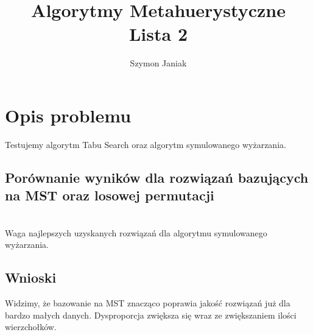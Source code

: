 \documentclass{article}
\title{%
	Algorytmy Metahuerystyczne \\
	\large Lista 2}
\author{Szymon Janiak}
\begin{document}
\maketitle

\section*{Opis problemu}
	Testujemy algorytm Tabu Search oraz algorytm symulowanego wyżarzania.

\subsection*{Porównanie wyników dla rozwiązań bazujących na MST oraz losowej permutacji}
    \begin{center}
		\\Waga najlepszych uzyskanych rozwiązań dla algorytmu symulowanego wyżarzania.
    \end{center}
\subsection*{Wnioski}
	Widzimy, że bazowanie na MST znacząco poprawia jakość rozwiązań już dla bardzo małych danych. Dysproporcja zwiększa się wraz ze zwiększaniem ilości wierzchołków.
\end{document}
